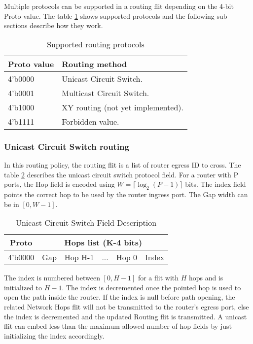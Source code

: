 Multiple protocols can be supported in a routing flit depending on the 4-bit Proto value. The table
\ref{supported_protocol} shows supported protocols and the following sub-sections describe how they work.


\begin{table}[h]
  \centering
  \begin{tabular}{l | l}
    \toprule\hline
    \textbf{Proto value} & \textbf{Routing method} \\
    \hline\hline
    4'b0000 & Unicast Circuit Switch. \\
    \hline
    4'b0001 & Multicast Circuit Switch. \\
    \hline
    4'b1000 & XY routing (not yet implemented).\\
    \hline
    4'b1111 & Forbidden value. \\
    \hline\bottomrule
  \end{tabular}
  \caption{Supported routing protocols}
  \label{supported_protocol}
\end{table}


\subsubsection{Unicast Circuit Switch routing}

In this routing policy, the routing flit is a list of router egress ID to cross. The table
\ref{unicast_circuit_switch_field} describes the unicast circuit switch protocol field. For a router with P ports, the
Hop field is encoded using $W=\lceil \log_2(P-1)\rceil$ bits. The index field points the correct hop to be used by the
router ingress port. The Gap width can be in $[0, W-1]$.

\begin{table}[h]
  \centering
  \begin{tabular}{c | c | c | c | c | c}
    \toprule
    \hline
    \textbf{Proto} & \multicolumn{5}{c}{\textbf{Hops list (K-4 bits)}} \\
    \hline\hline
    4'b0000 & Gap & Hop H-1 & ... & Hop 0 & Index \\
    \hline
    \bottomrule
  \end{tabular}
  \caption{Unicast Circuit Switch Field Description}
  \label{unicast_circuit_switch_field}
\end{table}

The index is numbered between $[0, H-1]$ for a flit with $H$ hops and is initialized to $H-1$. The index is decremented
once the pointed hop is used to open the path inside the router. If the index is null before path opening, the related
Network Hops flit will not be transmitted to the router's egress port, else the index is decremented and the updated
Routing flit is transmitted. A unicast flit can embed less than the maximum allowed number of hop fields by just
initializing the index accordingly.

